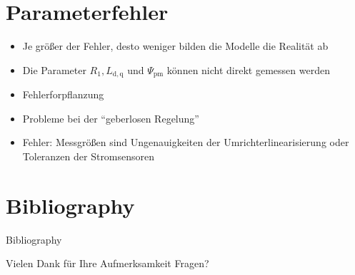 \documentclass{beamer}
\newcommand{\x}[1]{\mathrm{#1}}
\begin{document}
\section{Parameterfehler}
\begin{frame}
\begin{itemize}
	\item Je größer der Fehler, desto weniger bilden die Modelle die Realität ab
	\item Die Parameter $R_\x{1}, L_\x{d,q}$ und $\Psi_\x{pm}$ können nicht direkt gemessen werden
	\item Fehlerforpflanzung
	\item Probleme bei der \enquote{geberlosen Regelung}
	\item Fehler: Messgrößen sind Ungenauigkeiten der Umrichterlinearisierung oder Toleranzen der Stromsensoren
\end{itemize}
\end{frame}

\section*{Bibliography}
\begin{frame}[allowframebreaks]{Bibliography}
\nocite{ternesfeldkamp}
\nocite{Bruhn2009}
\nocite{Perassi2006}
\nocite{genduso}
\nocite{fischer2009}
\printbibliography
\end{frame}

\begin{frame}[plain]{Vielen Dank für Ihre Aufmerksamkeit}	
	\huge{Fragen?}		
\end{frame}

\end{document}
